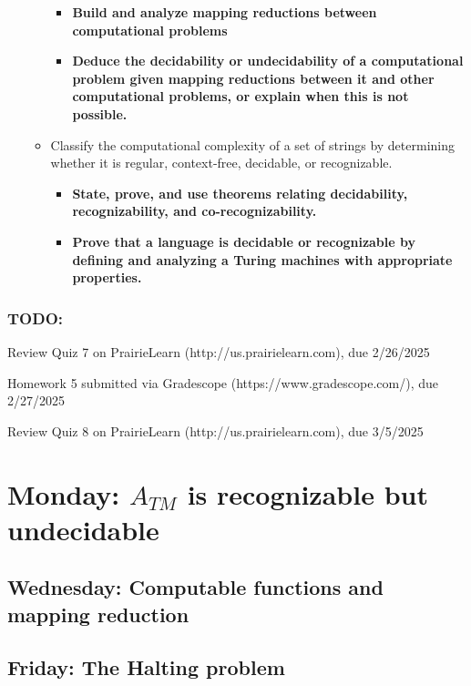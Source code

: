 \begin{itemize}
\begin{itemize}
\begin{itemize}
              \item {\bf Build and analyze mapping reductions between computational problems}
              \item {\bf Deduce the decidability or undecidability of a computational problem given mapping reductions between it and other computational problems, or explain when this is not possible.}
           \end{itemize}
    \item Classify the computational complexity of a set of strings by determining whether it is regular, context-free, decidable, or recognizable.
    \begin{itemize}
    \item {\bf State, prove, and use theorems relating decidability, recognizability, and co-recognizability.}
    \item {\bf Prove that a language is decidable or recognizable by defining and analyzing a Turing machines with appropriate properties.}
\end{itemize}
\end{itemize}
\end{itemize}

\vspace{-20pt}

\subsubsection*{TODO:}
\begin{list}{\itemsep-10pt}
   \item Review Quiz 7 on PrairieLearn (http://us.prairielearn.com), due 2/26/2025
   \item Homework 5 submitted via Gradescope (https://www.gradescope.com/), due 2/27/2025
   \item Review Quiz 8 on PrairieLearn (http://us.prairielearn.com), due 3/5/2025
\end{list}

\newpage

\section*{Monday: $A_{TM}$ is recognizable but undecidable}


    
\newpage
\subsection*{Wednesday: Computable functions and mapping reduction}




\newpage
\subsection*{Friday: The Halting problem}



\newpage
